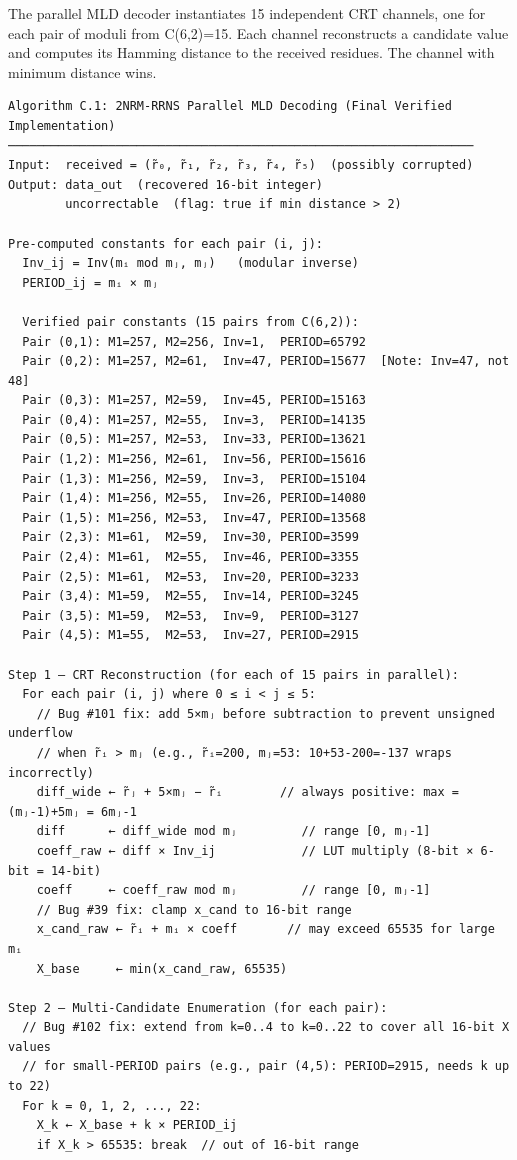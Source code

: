 \documentclass[
  english,
  12pt,
]{report}
\begin{document}
The parallel MLD decoder instantiates 15 independent CRT channels, one
for each pair of moduli from C(6,2)=15. Each channel reconstructs a
candidate value and computes its Hamming distance to the received
residues. The channel with minimum distance wins.

\begin{verbatim}
Algorithm C.1: 2NRM-RRNS Parallel MLD Decoding (Final Verified Implementation)
─────────────────────────────────────────────────────────────────
Input:  received = (r̃₀, r̃₁, r̃₂, r̃₃, r̃₄, r̃₅)  (possibly corrupted)
Output: data_out  (recovered 16-bit integer)
        uncorrectable  (flag: true if min distance > 2)

Pre-computed constants for each pair (i, j):
  Inv_ij = Inv(mᵢ mod mⱼ, mⱼ)   (modular inverse)
  PERIOD_ij = mᵢ × mⱼ

  Verified pair constants (15 pairs from C(6,2)):
  Pair (0,1): M1=257, M2=256, Inv=1,  PERIOD=65792
  Pair (0,2): M1=257, M2=61,  Inv=47, PERIOD=15677  [Note: Inv=47, not 48]
  Pair (0,3): M1=257, M2=59,  Inv=45, PERIOD=15163
  Pair (0,4): M1=257, M2=55,  Inv=3,  PERIOD=14135
  Pair (0,5): M1=257, M2=53,  Inv=33, PERIOD=13621
  Pair (1,2): M1=256, M2=61,  Inv=56, PERIOD=15616
  Pair (1,3): M1=256, M2=59,  Inv=3,  PERIOD=15104
  Pair (1,4): M1=256, M2=55,  Inv=26, PERIOD=14080
  Pair (1,5): M1=256, M2=53,  Inv=47, PERIOD=13568
  Pair (2,3): M1=61,  M2=59,  Inv=30, PERIOD=3599
  Pair (2,4): M1=61,  M2=55,  Inv=46, PERIOD=3355
  Pair (2,5): M1=61,  M2=53,  Inv=20, PERIOD=3233
  Pair (3,4): M1=59,  M2=55,  Inv=14, PERIOD=3245
  Pair (3,5): M1=59,  M2=53,  Inv=9,  PERIOD=3127
  Pair (4,5): M1=55,  M2=53,  Inv=27, PERIOD=2915

Step 1 — CRT Reconstruction (for each of 15 pairs in parallel):
  For each pair (i, j) where 0 ≤ i < j ≤ 5:
    // Bug #101 fix: add 5×mⱼ before subtraction to prevent unsigned underflow
    // when r̃ᵢ > mⱼ (e.g., r̃ᵢ=200, mⱼ=53: 10+53-200=-137 wraps incorrectly)
    diff_wide ← r̃ⱼ + 5×mⱼ − r̃ᵢ        // always positive: max = (mⱼ-1)+5mⱼ = 6mⱼ-1
    diff      ← diff_wide mod mⱼ         // range [0, mⱼ-1]
    coeff_raw ← diff × Inv_ij            // LUT multiply (8-bit × 6-bit = 14-bit)
    coeff     ← coeff_raw mod mⱼ         // range [0, mⱼ-1]
    // Bug #39 fix: clamp x_cand to 16-bit range
    x_cand_raw ← r̃ᵢ + mᵢ × coeff       // may exceed 65535 for large mᵢ
    X_base     ← min(x_cand_raw, 65535)

Step 2 — Multi-Candidate Enumeration (for each pair):
  // Bug #102 fix: extend from k=0..4 to k=0..22 to cover all 16-bit X values
  // for small-PERIOD pairs (e.g., pair (4,5): PERIOD=2915, needs k up to 22)
  For k = 0, 1, 2, ..., 22:
    X_k ← X_base + k × PERIOD_ij
    if X_k > 65535: break  // out of 16-bit range


\end{verbatim}
\end{document}
